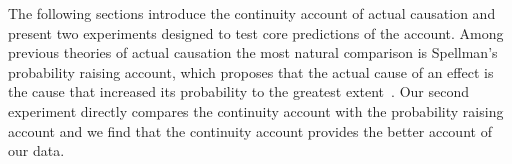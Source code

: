 \documentclass[10pt,letterpaper]{article}
\newcommand{\ev}[2]{$#1_#2$}
\begin{document}
The following sections introduce the continuity account of actual causation and present two experiments designed to test core predictions of the account. Among previous theories of actual causation the most natural comparison is Spellman's probability raising account, which proposes that the actual cause of an effect is the cause that increased its probability to the greatest extent~\cite{spellman97}. Our second experiment directly compares the continuity account with the probability raising account and we find that the continuity account provides the better account of our data.


\end{document}
